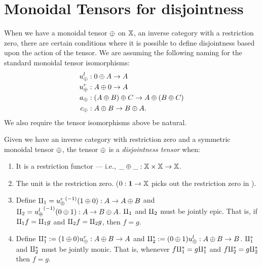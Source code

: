 \section{Monoidal Tensors for disjointness} %
\label{sec:tensors_for_disjointness}

When we have a monoidal tensor $\oplus$ on $\mathbb{X}$, an inverse category with a restriction zero,
there are certain conditions where it is possible to define disjointness based upon the action of the
tensor. We are assuming the following naming for the standard monoidal tensor
isomorphisms:
\begin{align*}
   u_{\oplus}^l &: 0 \oplus A \to A\\
   u_{\oplus}^r &: A \oplus 0 \to A\\
   a_\oplus &: (A \oplus B) \oplus C \to A \oplus (B \oplus C) \\
   c_\oplus &: A \oplus B \to B \oplus A.
 \end{align*}
We also require the tensor isomorphisms above be natural.

\begin{definition}\label{def:disjointness_tensor}
  Given we have an inverse category \X with restriction zero and a symmetric monoidal tensor
  $\oplus$, the tensor $\oplus$ is a \emph{disjointness tensor} when:
  \begin{enumerate}[{(}i{)}]
    \item It is a restriction functor --- i.e., $\_ \oplus \_ : \mathbb{X} \times \mathbb{X} \to \mathbb{X}$.
    \item The unit is the restriction zero. ($0 : \boldsymbol{1}\to \mathbb{X}$ picks out the restriction
    zero in \X).
    \item Define $\amalg_{1} = {u_{\oplus}^r}^{(-1)}(1\oplus0):A\to A\oplus B$ and $\amalg_{2} = {u_{\oplus}^l}^{(-1)}(0\oplus1): A\to B\oplus A$.
      $\amalg_{1}$ and $\amalg_{2}$ must be jointly epic. That is, if $\amalg_{1} f = \amalg_{1} g$ and $\amalg_{2} f = \amalg_{2} g$, then
      $f = g$.
    \item Define $\amalg_{1}^{*} := (1\oplus0)u_{\oplus}^r: A\oplus B \to A$ and $\amalg_{2}^{*} := (0\oplus1)u_{\oplus}^l:A\oplus B \to B$.
      $\amalg_{1}^{*}$  and $\amalg_{2}^{*}$ must be jointly monic. That is, whenever $f\amalg_{1}^{*} = g \amalg_{1}^{*}$ and
      $f\amalg_{2}^{*} = g\amalg_{2}^{*}$ then $f = g$.
  \end{enumerate}
\end{definition}

